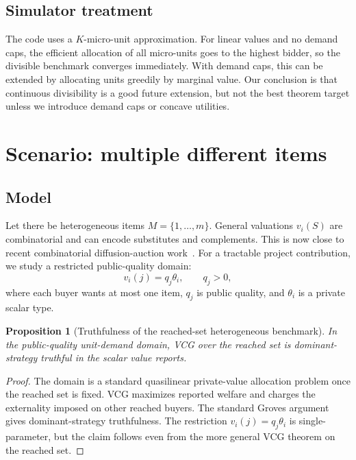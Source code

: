 \documentclass[11pt]{article}
\newtheorem{proposition}{Proposition}
\begin{document}
\subsection{Simulator treatment}

The code uses a $K$-micro-unit approximation.  For linear values and no demand caps, the efficient allocation of all micro-units goes to the highest bidder, so the divisible benchmark converges immediately.  With demand caps, this can be extended by allocating units greedily by marginal value.  Our conclusion is that continuous divisibility is a good future extension, but not the best theorem target unless we introduce demand caps or concave utilities.

\section{Scenario: multiple different items}

\subsection{Model}

Let there be heterogeneous items $M=\{1,\dots,m\}$.  General valuations $v_i(S)$ are combinatorial and can encode substitutes and complements.  This is now close to recent combinatorial diffusion-auction work~\cite{fang2024meta,li2024combinatorial}.  For a tractable project contribution, we study a restricted public-quality domain:
\[
    v_i(j)=q_j\theta_i,\qquad q_j>0,
\]
where each buyer wants at most one item, $q_j$ is public quality, and $\theta_i$ is a private scalar type.

\begin{proposition}[Truthfulness of the reached-set heterogeneous benchmark]
In the public-quality unit-demand domain, VCG over the reached set is dominant-strategy truthful in the scalar value reports.
\end{proposition}

\begin{proof}
The domain is a standard quasilinear private-value allocation problem once the reached set is fixed.  VCG maximizes reported welfare and charges the externality imposed on other reached buyers.  The standard Groves argument gives dominant-strategy truthfulness.  The restriction $v_i(j)=q_j\theta_i$ is single-parameter, but the claim follows even from the more general VCG theorem on the reached set.
\end{proof}
\end{document}
